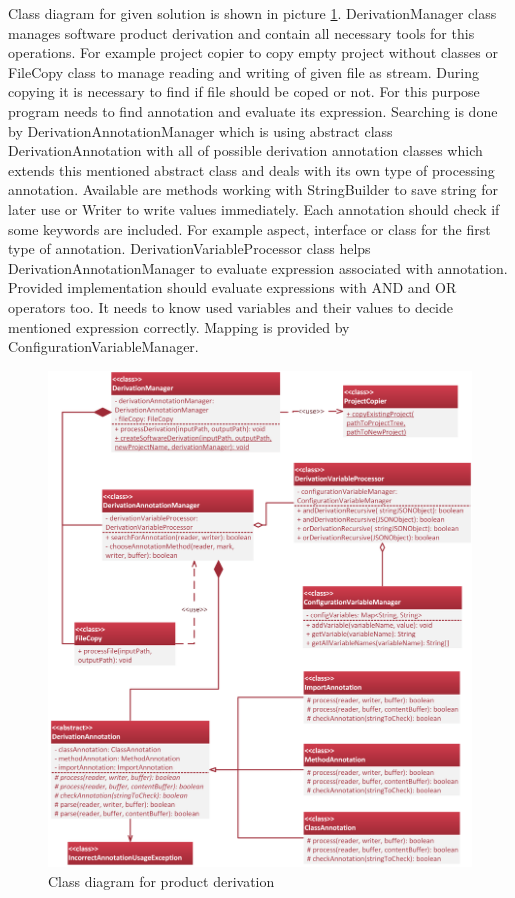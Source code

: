 \documentclass[11pt,slovak,a4paper,twoside]{article}
\begin{document}
Class diagram for given solution is shown in picture \ref{derivationProductClassDiagram}. DerivationManager class manages software product derivation and contain all necessary tools for this operations. For example project copier to copy empty project without classes or FileCopy class to manage reading and writing of given file as stream. During copying it is necessary to find if file should be coped or not. For this purpose program needs to find annotation and evaluate its expression. Searching is done by DerivationAnnotationManager which is using abstract class DerivationAnnotation with all of possible derivation annotation classes which extends this mentioned abstract class and deals with its own type of processing annotation. Available are methods working with StringBuilder to save string for later use or Writer to write values immediately. Each annotation should check if some keywords are included. For example aspect, interface or class for the first type of annotation. DerivationVariableProcessor class helps DerivationAnnotationManager to evaluate expression associated with annotation. Provided implementation should evaluate expressions with AND and OR operators too. It needs to know used variables and their values to decide mentioned expression correctly. Mapping is provided by ConfigurationVariableManager.

\begin{figure}[H]  %
					\begin{center}
									\includegraphics[width=\linewidth]{fig/DerivationClassTight.png}
									\caption{Class diagram for product derivation}
									\label{derivationProductClassDiagram}
					\end{center}
\end{figure}
\end{document}

